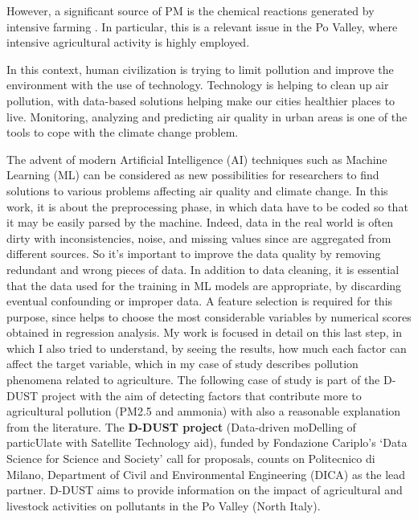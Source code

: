 However, a significant source of PM is the chemical reactions generated by intensive farming \cite{burkart2007diffuse}.
In particular, this is a relevant issue in the Po Valley, where intensive agricultural activity is highly employed.\par
In this context, human civilization is trying to limit pollution and improve the environment with the use of technology.\newline
Technology is helping to clean up air pollution, with data-based solutions helping make our cities healthier places to live.\newline
Monitoring, analyzing and predicting air quality in urban areas is one of the tools to cope with the climate change problem.\par
The advent of modern Artificial Intelligence (AI) techniques such as Machine Learning (ML) can be considered as new possibilities for researchers to find solutions to various problems affecting air quality and climate change.
\bigskip
In this work, it is about the preprocessing phase, in which data have to be coded so that it may be easily parsed by the machine. 
Indeed, data in the real world is often dirty with inconsistencies, noise, and missing values since are aggregated from different sources. So it's important to improve the data quality by removing redundant and wrong pieces of data.
In addition to data cleaning, it is essential that the data used for the training in ML models are appropriate, by discarding eventual confounding or improper data.
A feature selection is required for this purpose, since helps to choose the most considerable variables by numerical scores obtained in regression analysis.
My work is focused in detail on this last step, in which I also tried to understand, by seeing the results, how much each factor can affect the target variable, which in my case of study describes pollution phenomena related to agriculture.
The following case of study is part of the D-DUST project with the aim of detecting factors that contribute more to agricultural pollution (PM2.5 and ammonia) with also a reasonable explanation from the literature.
The \textbf{D-DUST project} (Data-driven moDelling of particUlate with Satellite Technology aid), funded by Fondazione Cariplo’s ‘Data Science for Science and Society’ call for proposals, counts on Politecnico di Milano, Department of Civil and Environmental Engineering (DICA) as the lead partner.\newline
D-DUST aims to provide information on the impact of agricultural and livestock activities on pollutants in the Po Valley (North Italy).\par 
